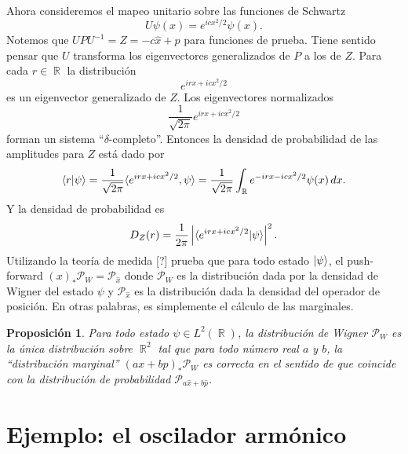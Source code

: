 \documentclass[a4paper]{report}
\DeclareMathOperator{\R}{\mathbb{R}}
\newtheorem{proposition}{Proposición}
\begin{document}
  Ahora consideremos el mapeo unitario sobre las funciones
  de Schwartz
  \[
    U\psi(x) = e^{icx^2 / 2} \psi(x).
  \] 
  Notemos que $UPU^{-1} = Z = -c \hat{x} + \hat{p}$ para
  funciones de prueba. Tiene sentido pensar que $U$ 
  transforma los eigenvectores generalizados de $P$ a los de
  $Z$. Para cada $r \in \R$ la distribución
  \[
    e^{irx + icx^2 / 2}
  \] 
  es un eigenvector generalizado de $Z$. Los eigenvectores
  normalizados
  \[
    \frac{1}{\sqrt{2\pi}} e^{irx + icx^2 / 2}
  \] 
  forman un sistema ``$\delta$-completo''. Entonces la
  densidad de probabilidad de las amplitudes para $Z$ está
  dado por
  \[
    \braket{r|\psi}
    = \frac{1}{\sqrt{2\pi}} \langle e^{irx + i cx^2 / 2},
    \psi \rangle
    = \frac{1}{\sqrt{2\pi}} \int_{\R} e^{-irx-icx^2 /
    2}\psi(x) \, dx.
  \] 
  Y la densidad de probabilidad es
  \[
    D_Z(r)
    = \frac{1}{2\pi} \left|
    \braket{e^{irx+icx^2 / 2}|\psi}
    \right|^2.
  \] 
  Utilizando la teoría de medida [?] prueba que para todo
  estado $\ket \psi$, el push-forward $(x)_* \mathcal P_W =
  \mathcal P_{\hat{x}}$ donde $\mathcal P_W$ es la
  distribución dada por la densidad de Wigner del estado
  $\psi$ y $\mathcal P_{\hat{x}}$ es la distribución dada la
  densidad del operador de posición. En otras palabras, es
  simplemente el cálculo de las marginales.

  \begin{proposition}
    Para todo estado $\psi \in L^2(\R)$, la distribución de
    Wigner $\mathcal P_W$ es la única distribución sobre
    $\R^{2}$ tal que para todo número real $a$ y $b$, la
    ``distribución marginal'' $(ax+bp)_{*} \mathcal P_W$ es
    correcta en el sentido de que coincide con la
    distribución de probabilidad $\mathcal P_{a \hat{x} + b
    \hat{p}}$.
  \end{proposition}

  \section{Ejemplo: el oscilador armónico}
\end{document}
